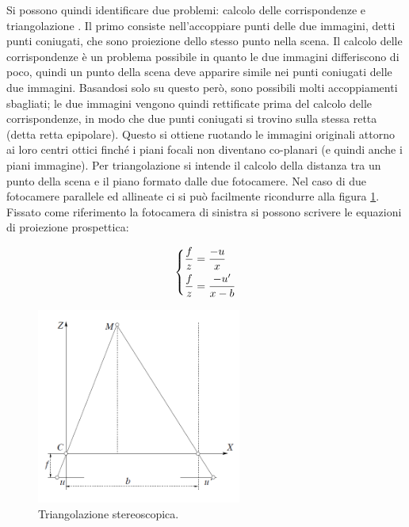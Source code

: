\documentclass[12pt]{report}
\begin{document}
			Si possono quindi identificare due problemi: calcolo delle corrispondenze e triangolazione \cite{fusiello}.\newline
			Il primo consiste nell'accoppiare punti delle due immagini, detti punti coniugati, che sono proiezione dello stesso punto nella scena. Il calcolo delle corrispondenze è un problema possibile in quanto le due immagini differiscono di poco, quindi un punto della scena deve apparire simile nei punti coniugati delle due immagini. Basandosi solo su questo però, sono possibili molti accoppiamenti sbagliati; le due immagini vengono quindi rettificate prima del calcolo delle corrispondenze, in modo che due punti coniugati si trovino sulla stessa retta (detta retta epipolare). Questo si ottiene ruotando le immagini originali attorno ai loro centri ottici finché i piani 
			focali non diventano co-planari (e quindi anche i piani immagine).\newline
			Per triangolazione si intende il calcolo della distanza tra un punto della scena e il piano formato dalle due fotocamere. Nel caso di due fotocamere parallele ed allineate ci si può facilmente ricondurre alla figura \ref{fig:triangolazione}.\newline
			Fissato come riferimento la fotocamera di sinistra si possono scrivere le equazioni di proiezione prospettica:
			
			\begin{equation}
				\begin{dcases}
					\frac{f}{z}=\frac{-u}{x} \\
					\frac{f}{z}=\frac{-u'}{x-b}
				\end{dcases}
				\label{eq:sistema}
			\end{equation}
			
			\begin{figure}
				\includegraphics[width=0.6\textwidth]{./figures/Triangolazione_stereoscopica.png}
				\caption{Triangolazione stereoscopica.}
				\label{fig:triangolazione}
			\end{figure}
			
\end{document}
